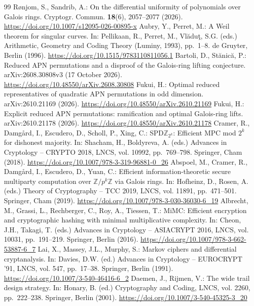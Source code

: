 \documentclass[11pt]{article}
\theoremstyle{definition}
\theoremstyle{remark}
\begin{document}
\begin{thebibliography}{99}
 Rønjom, S., Sandrib, A.: On the differential uniformity of polynomials over Galois rings. Cryptogr.
Commun. \textbf{18}(6), 2057--2077 (2026). \url{https://doi.org/10.1007/s12095-026-00895-x}
 Aubry, Y., Perret, M.: A Weil theorem for singular curves. In: Pellikaan, R., Perret, M., Vl\u{a}du\c{t},
S.G. (eds.) Arithmetic, Geometry and Coding Theory (Luminy, 1993), pp.~1--8. de Gruyter, Berlin (1996).
\url{https://doi.org/10.1515/9783110811056.1}
 Bartoli, D., Stănică, P.: Reduced APN permutations and a disproof of the Galois-ring lifting conjecture.
arXiv:2608.30808v3 (17 October 2026). \url{https://doi.org/10.48550/arXiv.2608.30808}
 Fukui, H.: Optimal reduced representatives of quadratic APN permutations in odd dimension.
arXiv:2610.21169 (2026). \url{https://doi.org/10.48550/arXiv.2610.21169}
 Fukui, H.: Explicit reduced APN permutations: ramification and optimal Galois-ring lifts.
arXiv:2610.21178 (2026). \url{https://doi.org/10.48550/arXiv.2610.21178}
 Cramer, R., Damgård, I., Escudero, D., Scholl, P., Xing, C.: SPD$\mathbb{Z}_{2^k}$: Efficient MPC mod
$2^k$ for dishonest majority. In: Shacham, H., Boldyreva, A. (eds.) Advances in Cryptology -- CRYPTO 2018, LNCS, vol.
10992, pp.~769--798. Springer, Cham (2018). \url{https://doi.org/10.1007/978-3-319-96881-0_26}
 Abspoel, M., Cramer, R., Damgård, I., Escudero, D., Yuan, C.: Efficient information-theoretic secure
multiparty computation over $\mathbb{Z}/p^k\mathbb{Z}$ via Galois rings. In: Hofheinz, D., Rosen, A. (eds.) Theory of
Cryptography -- TCC 2019, LNCS, vol. 11891, pp.~471--501. Springer, Cham (2019).
\url{https://doi.org/10.1007/978-3-030-36030-6_19}
 Albrecht, M., Grassi, L., Rechberger, C., Roy, A., Tiessen, T.: MiMC: Efficient encryption and
cryptographic hashing with minimal multiplicative complexity. In: Cheon, J.H., Takagi, T. (eds.) Advances in
Cryptology -- ASIACRYPT 2016, LNCS, vol. 10031, pp.~191--219. Springer, Berlin (2016).
\url{https://doi.org/10.1007/978-3-662-53887-6_7}
 Lai, X., Massey, J.L., Murphy, S.: Markov ciphers and differential cryptanalysis. In: Davies, D.W. (ed.)
Advances in Cryptology -- EUROCRYPT '91, LNCS, vol. 547, pp.~17--38. Springer, Berlin (1991).
\url{https://doi.org/10.1007/3-540-46416-6_2}
 Daemen, J., Rijmen, V.: The wide trail design strategy. In: Honary, B. (ed.) Cryptography and Coding,
LNCS, vol. 2260, pp.~222--238. Springer, Berlin (2001). \url{https://doi.org/10.1007/3-540-45325-3_20}

\end{thebibliography}
\end{document}
